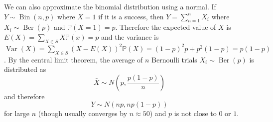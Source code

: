 \documentclass{article}
\newcommand{\p}{\mathbb{P}}
\theoremstyle{definition}
\begin{document}
We can also approximate the binomial distribution using a normal. If $Y\sim \operatorname{Bin}(n,p)$ where $X=1$ if it is a success, then $Y = \displaystyle{\sum^n_{n=1}X_i}$ where $X_i \sim \operatorname{Ber}(p)$ and $\p (X=1) =p$. Therefore the expected value of $X$ is $E(X) = \displaystyle{\sum_{X\in S}}X\p (x) = p$ and the variance is $\operatorname{Var}(X) = \displaystyle{\sum_{X\in S}}(X-E(X))^2\p (X) = (1-p)^2p + p^2(1-p) =p(1-p)$. By the central limit theorem, the average of $n$ Bernoulli trials $X_i \sim \operatorname{Ber}(p)$ is distributed as 
\begin{equation*}
    \bar X \sim N \left( p , \frac{p(1-p)}{n}\right)
\end{equation*}
and therefore
\begin{equation*}
    Y \sim N(np, np(1-p))
\end{equation*}
for large $n$ (though usually converges by $n\approx 50$) and $p$ is not close to $0$ or $1$.
\end{document}
